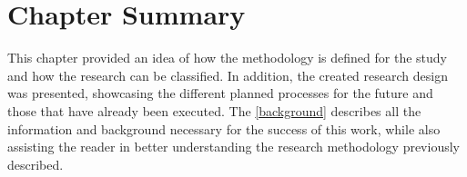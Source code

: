 

\section{Chapter Summary}\label{sec:met-4}

This chapter provided an idea of how the methodology is defined for the study and how the research can be classified. In addition, the created research design was presented, showcasing the different planned processes for the future and those that have already been executed. The \autoref{background} describes all the information and background necessary for the success of this work, while also assisting the reader in better understanding the research methodology previously described.








